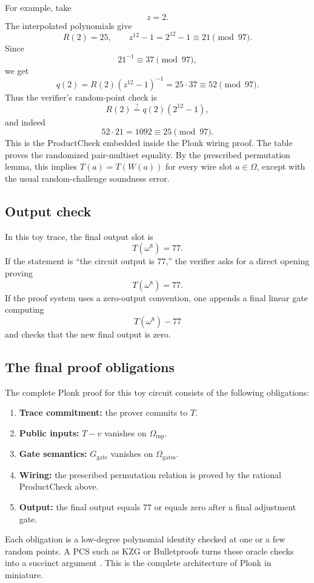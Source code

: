 For example, take
\[
    z=2.
\]
The interpolated polynomials give
\[
    R(2)=25,
    \qquad
    z^{12}-1=2^{12}-1\equiv21\pmod{97}.
\]
Since
\[
    21^{-1}\equiv 37\pmod{97},
\]
we get
\[
    q(2)=R(2)(z^{12}-1)^{-1}=25\cdot37\equiv52\pmod{97}.
\]
Thus the verifier's random-point check is
\[
    R(2)
    \stackrel{?}{=}
    q(2)(2^{12}-1),
\]
and indeed
\[
    52\cdot21=1092\equiv25\pmod{97}.
\]
This is the ProductCheck embedded inside the Plonk wiring proof. The table proves the randomized pair-multiset equality. By the prescribed permutation lemma, this implies $T(a)=T(W(a))$ for every wire slot $a\in\Omega$, except with the usual random-challenge soundness error.

\subsection{Output check}

In this toy trace, the final output slot is
\[
    T(\omega^8)=77.
\]
If the statement is ``the circuit output is $77$,'' the verifier asks for a direct opening proving
\[
    T(\omega^8)=77.
\]
If the proof system uses a zero-output convention, one appends a final linear gate computing
\[
    T(\omega^8)-77
\]
and checks that the new final output is zero.

\subsection{The final proof obligations}

The complete Plonk proof for this toy circuit consists of the following obligations:
\begin{enumerate}[leftmargin=2em]
    \item \textbf{Trace commitment:} the prover commits to $T$.
    \item \textbf{Public inputs:} $T-v$ vanishes on $\Omega_{\mathrm{inp}}$.
    \item \textbf{Gate semantics:} $G_{\mathrm{gate}}$ vanishes on $\Omega_{\mathrm{gates}}$.
    \item \textbf{Wiring:} the prescribed permutation relation is proved by the rational ProductCheck above.
    \item \textbf{Output:} the final output equals $77$ or equals zero after a final adjustment gate.
\end{enumerate}

Each obligation is a low-degree polynomial identity checked at one or a few random points. A PCS such as KZG or Bulletproofs turns these oracle checks into a succinct argument \cite{KateZaveruchaGoldberg2010,Bulletproofs2018}. This is the complete architecture of Plonk in miniature.


